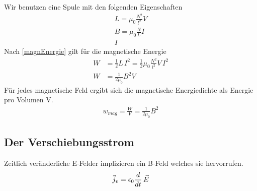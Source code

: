 Wir benutzen eine Spule mit den folgenden Eigenschaften
\begin{align*}
L = \mu_0 \frac{N^2}{l^2}V \\
B = \mu_0 \frac{N}{L}I \\
I
\end{align*}
Nach \ref{magnEnergie} gilt für die magnetische Energie
\begin{align*}
W &= \frac{1}{2}L\, I^2 = \frac{1}{2} \mu_0 \frac{N^2}{l^2}V \, I^2 \\
W &= \frac{1}{2 \mu_0} B^2 V
\end{align*}
Für jedes magnetische Feld ergibt sich die magnetische Energiedichte als Energie pro Volumen V.
\begin{align} \label{eqn:magnEnergiedichte}
\boxed{w_{mag} = \frac{W}{V} = \frac{1}{2 \mu_0}B^2}
\end{align}

\subsection{Der Verschiebungsstrom}
Zeitlich veränderliche E-Felder implizieren ein B-Feld welches sie hervorrufen.
\begin{align} \label{eqn:Verschiebungsstromdichte}
\vec{j}_v = \epsilon_0 \frac{d }{dt} \, {\vec{E}}
\end{align}